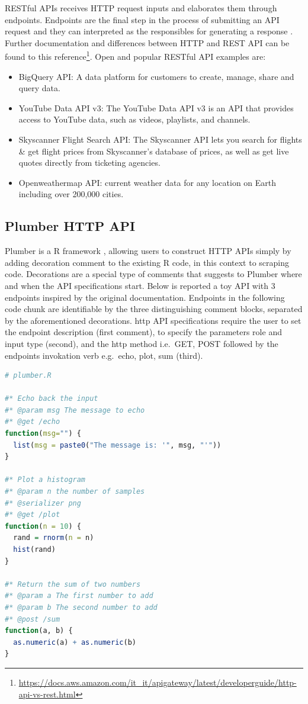 \documentclass[
  12pt,
  a4paper,
  oneside]{book}
\DeclareRobustCommand{\href}[2]{#2\footnote{\url{#1}}}
\providecommand{\tightlist}{%
  \setlength{\itemsep}{0pt}\setlength{\parskip}{0pt}}
\theoremstyle{definition}
\theoremstyle{definition}
\theoremstyle{definition}
\theoremstyle{remark}
\begin{document}
RESTful APIs receives HTTP request inputs and elaborates them through endpoints. Endpoints are the final step in the process of submitting an API request and they can interpreted as the responsibles for generating a response \citeyearpar{plumber}. Further documentation and differences between HTTP and REST API can be found to this \href{https://docs.aws.amazon.com/it_it/apigateway/latest/developerguide/http-api-vs-rest.html}{reference}.
Open and popular RESTful API examples are:

\begin{itemize}
\tightlist
\item
  BigQuery API: A data platform for customers to create, manage, share and query data.
\item
  YouTube Data API v3: The YouTube Data API v3 is an API that provides access to YouTube data, such as videos, playlists, and channels.
\item
  Skyscanner Flight Search API: The Skyscanner API lets you search for flights \& get flight prices from Skyscanner's database of prices, as well as get live quotes directly from ticketing agencies.
\item
  Openweathermap API: current weather data for any location on Earth including over 200,000 cities.
\end{itemize}

\hypertarget{plumberapi}{%
\subsection{Plumber HTTP API}\label{plumberapi}}

Plumber is a R framework \citep{an_api_generator_for_r}, allowing users to construct HTTP APIs simply by adding decoration comment to the existing R code, in this context to scraping code. Decorations are a special type of comments that suggests to Plumber where and when the API specifications start. Below is reported a toy API with 3 endpoints inspired by the original documentation. Endpoints in the following code chunk are identifiable by the three distinguishing comment blocks, separated by the aforementioned decorations. http API specifications require the user to set the endpoint description (first comment), to specify the parameters role and input type (second), and the http method i.e.~GET, POST followed by the endpoints invokation verb e.g.~echo, plot, sum (third).

\begin{lstlisting}[language=R]
# plumber.R

#* Echo back the input
#* @param msg The message to echo
#* @get /echo
function(msg="") {
  list(msg = paste0("The message is: '", msg, "'"))
}

#* Plot a histogram
#* @param n the number of samples
#* @serializer png
#* @get /plot
function(n = 10) {
  rand = rnorm(n = n)
  hist(rand)
}

#* Return the sum of two numbers
#* @param a The first number to add
#* @param b The second number to add
#* @post /sum
function(a, b) {
  as.numeric(a) + as.numeric(b)
}
\end{lstlisting}
\end{document}
